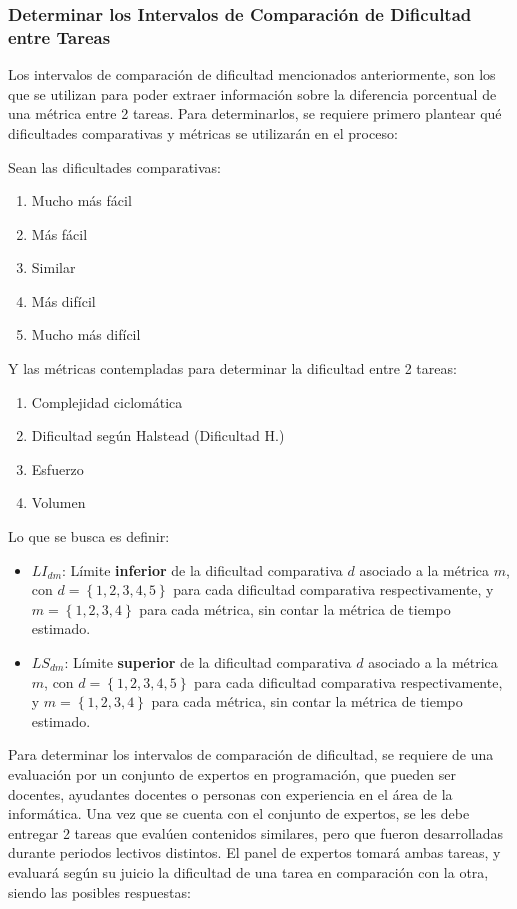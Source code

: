 \documentclass[letterpaper,12pt]{article}
\begin{document}
\subsubsection{Determinar los Intervalos de Comparación de Dificultad entre Tareas}

Los intervalos de comparación de dificultad mencionados anteriormente, son los que se utilizan para poder extraer información sobre la diferencia porcentual de una métrica entre 2 tareas. Para determinarlos, se requiere primero plantear qué dificultades comparativas y métricas se utilizarán en el proceso:

Sean las dificultades comparativas:

\begin{enumerate}
  \item Mucho más fácil
  \item Más fácil
  \item Similar
  \item Más difícil
  \item Mucho más difícil
\end{enumerate}


Y las métricas contempladas para determinar la dificultad entre 2 tareas:

\begin{enumerate}
  \item Complejidad ciclomática
  \item Dificultad según Halstead (Dificultad H.)
  \item Esfuerzo
  \item Volumen
\end{enumerate}

Lo que se busca es definir:

\begin{itemize}
  \item $LI_{dm}$: Límite \textbf{inferior} de la dificultad comparativa $d$ asociado a la métrica $m$, con $d = \left\{1, 2, 3, 4, 5\right\}$ para cada dificultad comparativa respectivamente, y $m = \left\{1, 2, 3, 4\right\}$ para cada métrica, sin contar la métrica de tiempo estimado.
  \item $LS_{dm}$: Límite \textbf{superior} de la dificultad comparativa $d$ asociado a la métrica $m$, con $d = \left\{1, 2, 3, 4, 5\right\}$ para cada dificultad comparativa respectivamente, y $m = \left\{1, 2, 3, 4\right\}$ para cada métrica, sin contar la métrica de tiempo estimado.
\end{itemize}

Para determinar los intervalos de comparación de dificultad, se requiere de una evaluación por un conjunto de expertos en programación, que pueden ser docentes, ayudantes docentes o personas con experiencia en el área de la informática. Una vez que se cuenta con el conjunto de expertos, se les debe entregar 2 tareas que evalúen contenidos similares, pero que fueron desarrolladas durante periodos lectivos distintos. El panel de expertos tomará ambas tareas, y evaluará según su juicio la dificultad de una tarea en comparación con la otra, siendo las posibles respuestas:
\end{document}
